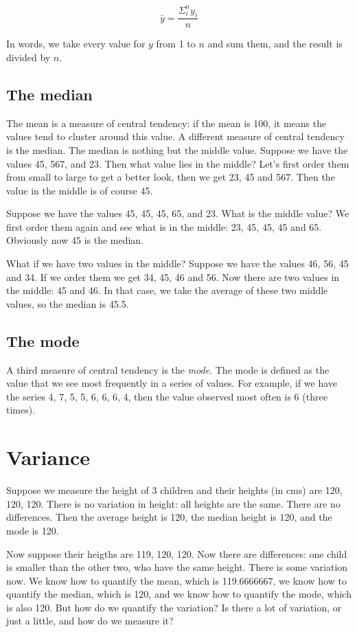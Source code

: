 \documentclass[]{report}\usepackage[]{graphicx}\usepackage[]{color}
\begin{document}
\begin{equation}
\bar{y} = \frac{\Sigma_i^n y_i}{n}
\end{equation}

In words, we take every value for $y$ from 1 to $n$ and sum them, and the result is divided by $n$.

\subsection{The median}
The mean is a measure of central tendency: if the mean is 100, it means the values tend to cluster around this value. A different measure of central tendency is the median. The median is nothing but the middle value. Suppose we have the values 45, 567, and 23. Then what value lies in the middle? Let's first order them from small to large to get a better look, then we get 23, 45 and 567. Then the value in the middle is of course 45. 

Suppose we have the values 45, 45, 45, 65, and 23. What is the middle value? We first order them again and see what is in the middle: 23, 45, 45, 45 and 65. Obviously now 45 is the median. 

What if we have two values in the middle? Suppose we have the values 46, 56, 45 and 34. If we order them we get 34, 45, 46 and 56. Now there are two values in the middle: 45 and 46. In that case, we take the average of these two middle values, so the median is 45.5.

\subsection{The mode}
A third measure of central tendency is the \textit{mode}. The mode is defined as the value that we see most frequently in a series of values. For example, if we have the series 4, 7, 5, 5, 6, 6, 6, 4, then the value observed most often is 6 (three times).  




\section{Variance}

Suppose we measure the height of 3 children and their heights (in cms) are 120, 120, 120. There is no variation in height: all heights are the same. There are no differences. Then the average height is 120, the median height is 120, and the mode is 120. 

Now suppose their heigths are 119, 120, 120. Now there are differences: one child is smaller than the other two, who have the same height. There is some variation now. We know how to quantify the mean, which is 119.6666667, we know how to quantify the median, which is 120, and we know how to quantify the mode, which is also 120. But how do we quantify the variation? Is there a lot of variation, or just a little, and how do we measure it? 
\end{document}
